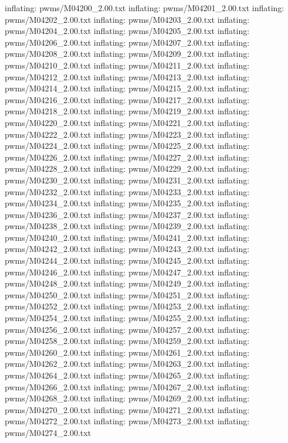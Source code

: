 \documentclass[letterpaper,10pt,english]{sphinxmanual}
\begin{document}
{\begin{sphinxVerbatim}[commandchars=\\\{\}]
  inflating: pwms/M04200\_2.00.txt
  inflating: pwms/M04201\_2.00.txt
  inflating: pwms/M04202\_2.00.txt
  inflating: pwms/M04203\_2.00.txt
  inflating: pwms/M04204\_2.00.txt
  inflating: pwms/M04205\_2.00.txt
  inflating: pwms/M04206\_2.00.txt
  inflating: pwms/M04207\_2.00.txt
  inflating: pwms/M04208\_2.00.txt
  inflating: pwms/M04209\_2.00.txt
  inflating: pwms/M04210\_2.00.txt
  inflating: pwms/M04211\_2.00.txt
  inflating: pwms/M04212\_2.00.txt
  inflating: pwms/M04213\_2.00.txt
  inflating: pwms/M04214\_2.00.txt
  inflating: pwms/M04215\_2.00.txt
  inflating: pwms/M04216\_2.00.txt
  inflating: pwms/M04217\_2.00.txt
  inflating: pwms/M04218\_2.00.txt
  inflating: pwms/M04219\_2.00.txt
  inflating: pwms/M04220\_2.00.txt
  inflating: pwms/M04221\_2.00.txt
  inflating: pwms/M04222\_2.00.txt
  inflating: pwms/M04223\_2.00.txt
  inflating: pwms/M04224\_2.00.txt
  inflating: pwms/M04225\_2.00.txt
  inflating: pwms/M04226\_2.00.txt
  inflating: pwms/M04227\_2.00.txt
  inflating: pwms/M04228\_2.00.txt
  inflating: pwms/M04229\_2.00.txt
  inflating: pwms/M04230\_2.00.txt
  inflating: pwms/M04231\_2.00.txt
  inflating: pwms/M04232\_2.00.txt
  inflating: pwms/M04233\_2.00.txt
  inflating: pwms/M04234\_2.00.txt
  inflating: pwms/M04235\_2.00.txt
  inflating: pwms/M04236\_2.00.txt
  inflating: pwms/M04237\_2.00.txt
  inflating: pwms/M04238\_2.00.txt
  inflating: pwms/M04239\_2.00.txt
  inflating: pwms/M04240\_2.00.txt
  inflating: pwms/M04241\_2.00.txt
  inflating: pwms/M04242\_2.00.txt
  inflating: pwms/M04243\_2.00.txt
  inflating: pwms/M04244\_2.00.txt
  inflating: pwms/M04245\_2.00.txt
  inflating: pwms/M04246\_2.00.txt
  inflating: pwms/M04247\_2.00.txt
  inflating: pwms/M04248\_2.00.txt
  inflating: pwms/M04249\_2.00.txt
  inflating: pwms/M04250\_2.00.txt
  inflating: pwms/M04251\_2.00.txt
  inflating: pwms/M04252\_2.00.txt
  inflating: pwms/M04253\_2.00.txt
  inflating: pwms/M04254\_2.00.txt
  inflating: pwms/M04255\_2.00.txt
  inflating: pwms/M04256\_2.00.txt
  inflating: pwms/M04257\_2.00.txt
  inflating: pwms/M04258\_2.00.txt
  inflating: pwms/M04259\_2.00.txt
  inflating: pwms/M04260\_2.00.txt
  inflating: pwms/M04261\_2.00.txt
  inflating: pwms/M04262\_2.00.txt
  inflating: pwms/M04263\_2.00.txt
  inflating: pwms/M04264\_2.00.txt
  inflating: pwms/M04265\_2.00.txt
  inflating: pwms/M04266\_2.00.txt
  inflating: pwms/M04267\_2.00.txt
  inflating: pwms/M04268\_2.00.txt
  inflating: pwms/M04269\_2.00.txt
  inflating: pwms/M04270\_2.00.txt
  inflating: pwms/M04271\_2.00.txt
  inflating: pwms/M04272\_2.00.txt
  inflating: pwms/M04273\_2.00.txt
  inflating: pwms/M04274\_2.00.txt

\end{sphinxVerbatim}}
\end{document}
